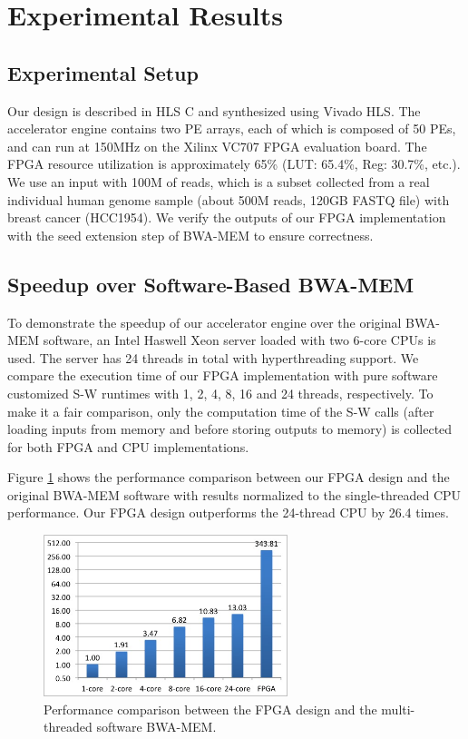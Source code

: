 \section{Experimental Results} 
\label{sec:results}
\subsection{Experimental Setup}

Our design is described in HLS C and synthesized using Vivado HLS.
The accelerator engine contains two PE arrays, each of which is composed of 50 PEs, and can run at 150MHz on the Xilinx VC707 FPGA evaluation board.
The FPGA resource utilization is approximately 65\% (LUT: 65.4\%, Reg: 30.7\%, etc.). 
We use an input with 100M of reads, which is a subset collected from a real individual human genome sample (about 500M reads, 120GB FASTQ file) with breast cancer (HCC1954). 
We verify the outputs of our FPGA implementation with the seed extension step of BWA-MEM to ensure correctness. 

\subsection{Speedup over Software-Based BWA-MEM}

To demonstrate the speedup of our accelerator engine over the original BWA-MEM software, 
an Intel Haswell Xeon server loaded with two 6-core CPUs is used.
The server has 24 threads in total with hyperthreading support.
We compare the execution time of our FPGA implementation with pure software customized S-W runtimes with 1, 2, 4, 8, 16 and 24 threads, respectively.
To make it a fair comparison, only the computation time of the S-W calls (after loading inputs from memory and before storing outputs to memory) is collected for both FPGA and CPU implementations.

Figure \ref{fig:F1C5} shows the performance comparison between our FPGA design and the original BWA-MEM software with results normalized to the single-threaded CPU performance.
Our FPGA design outperforms the 24-thread CPU by 26.4 times.

\begin{figure}[!hbt]
	\begin{center}
		\includegraphics[width=2.8in]{Figures/F1C5.jpg}
		\caption {Performance comparison between the FPGA design and the multi-threaded software BWA-MEM.}
		\label{fig:F1C5}
	\end{center}
\end{figure}

